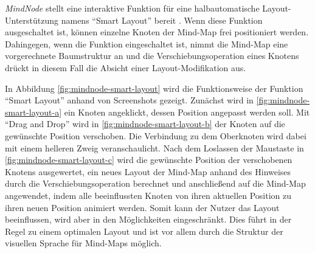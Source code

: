 \textit{MindNode} stellt eine interaktive Funktion für eine halbautomatische Layout-Unterstützung namens \enquote{Smart Layout} bereit \cite{14MindNode}. Wenn diese Funktion ausgeschaltet ist, können einzelne Knoten der Mind-Map frei positioniert werden. Dahingegen, wenn die Funktion eingeschaltet ist, nimmt die Mind-Map eine vorgerechnete Baumstruktur an und die Verschiebungsoperation eines Knotens drückt in diesem Fall die Absicht einer Layout-Modifikation aus.

In Abbildung \ref{fig:mindnode-smart-layout} wird die Funktionsweise der Funktion \enquote{Smart Layout} anhand von Screenshots gezeigt. Zunächst wird in \ref{fig:mindnode-smart-layout-a} ein Knoten angeklickt, dessen Position angepasst werden soll. Mit \enquote{Drag and Drop} wird in \ref{fig:mindnode-smart-layout-b} der Knoten auf die gewünschte Position verschoben. Die Verbindung zu dem Oberknoten wird dabei mit einem helleren Zweig veranschaulicht. Nach dem Loslassen der Maustaste in \ref{fig:mindnode-smart-layout-c} wird die gewünschte Position der verschobenen Knotens ausgewertet, ein neues Layout der Mind-Map anhand des Hinweises durch die Verschiebungsoperation berechnet und anschließend auf die Mind-Map angewendet, indem alle beeinflussten Knoten von ihren aktuellen Position zu ihren neuen Position animiert werden. Somit kann der Nutzer das Layout beeinflussen, wird aber in den Möglichkeiten eingeschränkt. Dies führt in der Regel zu einem optimalen Layout und ist vor allem durch die Struktur der visuellen Sprache für Mind-Maps möglich.


